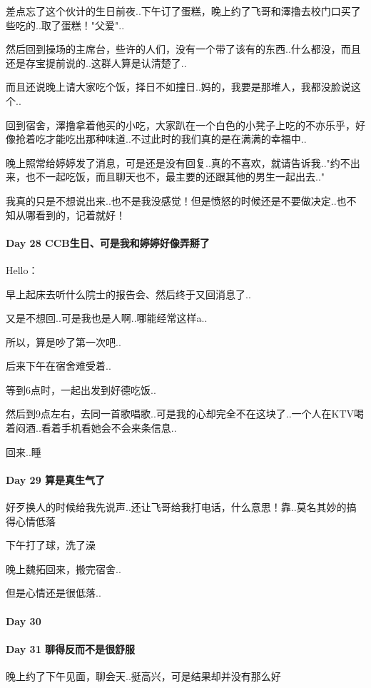 \documentclass[UTF8,a4paper,8pt]{ctexbook}
\begin{document}
	 	 差点忘了这个伙计的生日前夜..下午订了蛋糕，晚上约了飞哥和澤撸去校门口买了些吃的..取了蛋糕！"父爱"..
	 	 
	 	 然后回到操场的主席台，些许的人们，没有一个带了该有的东西..什么都没，而且还是存宝提前说的..这群人算是认清楚了..
	 	 
	 	 而且还说晚上请大家吃个饭，择日不如撞日..妈的，我要是那堆人，我都没脸说这个..
	 	 
	 	 回到宿舍，澤撸拿着他买的小吃，大家趴在一个白色的小凳子上吃的不亦乐乎，好像抢着吃才能吃出那种味道..不过此时的我们真的是在满满的幸福中..
	 	 
	 	 晚上照常给婷婷发了消息，可是还是没有回复..真的不喜欢，就请告诉我.."约不出来，也不一起吃饭，而且聊天也不，最主要的还跟其他的男生一起出去.."
	 	 
	 	 我真的只是不想说出来..也不是我没感觉！但是愤怒的时候还是不要做决定..也不知从哪看到的，记着就好！
 	 \paragraph{Day 28  CCB生日、可是我和婷婷好像弄掰了    \quad     }
 	 Hello：
 	 
	 	 早上起床去听什么院士的报告会、然后终于又回消息了..
	 	 
	 	 又是不想回..可是我也是人啊..哪能经常这样a..
	 	 
	 	 所以，算是吵了第一次吧..
	 	 
	 	 后来下午在宿舍难受着..
	 	 
	 	 等到6点时，一起出发到好德吃饭..
	 	 
	 	 然后到9点左右，去同一首歌唱歌..可是我的心却完全不在这块了..一个人在KTV喝着闷酒..看着手机看她会不会来条信息..
	 	 
	 	 回来..睡
 	 \paragraph{Day 29  算是真生气了   \quad     } 
	 	 好歹换人的时候给我先说声..还让飞哥给我打电话，什么意思！靠..莫名其妙的搞得心情低落
	 	 
	 	 下午打了球，洗了澡
	 	 
	 	 晚上魏拓回来，搬完宿舍..
	 	 
	 	 但是心情还是很低落.. 	   
 	 \paragraph{Day 30      \quad     }
 	 \paragraph{Day 31   聊得反而不是很舒服   \quad     }
	 	 晚上约了下午见面，聊会天..挺高兴，可是结果却并没有那么好
	 	 
\end{document}
